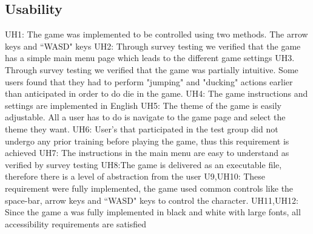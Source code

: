 \documentclass[12pt, titlepage]{article}
\begin{document}
\subsection{Usability}
UH1: The game was implemented to be controlled using two methods. The arrow keys and ``WASD" keys
UH2: Through survey testing we verified that the game has a simple main menu page which leads to the different game settings	UH3. Through survey testing we verified that the game was partially intuitive. Some users found that they had to perform "jumping" and "ducking" actions earlier than anticipated in order to do die in the game.
UH4: The game instructions and settings are implemented in English
UH5: The theme of the game is easily adjustable. All a user has to do is navigate to the game page and select the theme they want.
UH6: User's that participated in the test group did not undergo any prior training before playing the game, thus this requirement is achieved
UH7: The instructions in the main menu are easy to understand as verified by survey testing
UH8:The game is delivered as an executable file, therefore there is a level of abstraction from the user
U9,UH10: These requirement were fully implemented, the game used common controls like the space-bar, arrow keys and ``WASD" keys to control the character.
UH11,UH12: Since the game a was fully implemented in black and white with large fonts, all accessibility requirements are satisfied
\end{document}

